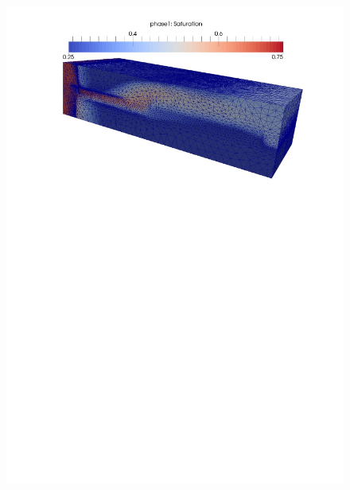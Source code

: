 \begin{landscape}
  \begin{figure}[ht] 
    \vbox{\vspace{0.cm}
        \hbox{\hspace{5.cm}
            \includegraphics[width=\textwidth]{./Pics1/3D_ChannelAdaptive/Test_SlowNewAdapt_288_Mesh_b} }
      \vspace{.5cm} 
         \hbox{\hspace{0.cm}
}}
\end{figure}
\end{landscape}
